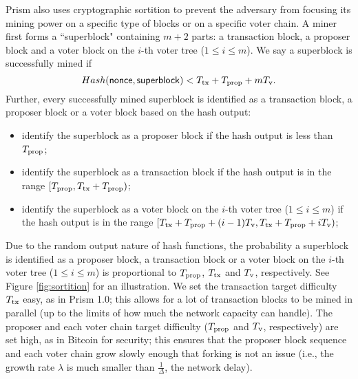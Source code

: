 \documentclass{article}
\begin{document}
{\sf Prism} also uses cryptographic sortition to prevent the adversary from focusing its mining power on a specific type of blocks or on a specific voter chain. A miner first forms a ``superblock" containing $m+2$ parts: a transaction block, a proposer block and a voter block on the $i$-th voter tree ($1\leq i \leq m$). We say a superblock is successfully  mined if 
\begin{equation}
    Hash({\sf nonce}, {\sf superblock}) < T_{\rm tx} + T_{\rm prop} + m T_{\rm v}. 
\label{eq:sortition}
\end{equation}
Further, every successfully mined superblock is identified as a transaction block, a proposer block or a voter block based on the hash output: 
\begin{itemize}
    \item identify the superblock as a proposer block if the hash output is less than $T_{\rm prop}$; 
    \item identify the superblock as a transaction block if the hash output is in the range $[T_{\rm prop}, T_{\rm tx} + T_{\rm prop})$;
    \item identify the superblock as a voter block on the $i$-th voter tree ($1\leq i \leq m$) if the hash output is in the range $[T_{\rm tx} + T_{\rm prop} + (i-1) T_{\rm v}, T_{\rm tx} + T_{\rm prop} + i T_{\rm v} )$;
\end{itemize}
    Due to the random output nature of hash functions, the probability a superblock is identified as a proposer block, a transaction block or a voter block on the $i$-th voter tree ($1\leq i \leq m$) is proportional to $T_{\rm prop}$, $T_{\rm tx}$ and $T_{\rm v}$, respectively. See Figure \ref{fig:sortition} for an  illustration. We set the transaction target difficulty $T_{\rm tx}$ easy, as in {\sf Prism 1.0}; this allows for a lot of transaction blocks to be mined in parallel (up to the limits of how much the network capacity can handle). The proposer and each voter chain target difficulty ($T_{\rm prop}$ and $T_{\rm v}$, respectively) are set high, as in {\sf Bitcoin} for security; this ensures that the proposer block sequence  and each voter chain grow slowly enough that forking is not an issue (i.e., the growth rate $\lambda$ is much smaller than $\frac{1}{\Delta}$, the network delay).  
\end{document}
